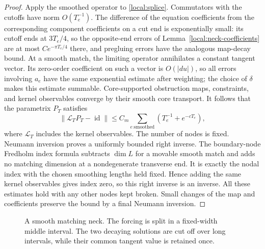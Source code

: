 \documentclass[11pt]{article}
\theoremstyle{definition}
\theoremstyle{remark}
\DeclareMathOperator{\id}{id}
\numberwithin{equation}{section}
\begin{document}
\begin{proof}
Apply the smoothed operator to \eqref{local:splice}.  Commutators with
the cutoffs have norm $O(T_e^{-1})$.  The difference of the equation
coefficients from the corresponding component coefficients on a
cut end is exponentially small: its cutoff ends at $3T_e/4$, so the
opposite-end errors of Lemma~\ref{local:neck-coefficients} are at most
$Ce^{-\pi T_e/4}$ there, and pregluing errors have the analogous
map-decay bound.  At a smooth match, the limiting operator annihilates
a constant tangent vector.  Its zero-order coefficient on such a
vector is $O(|du|)$, so all errors involving $a_e$ have the same
exponential estimate after weighting; the choice of $\delta$ makes
this estimate summable.  Core-supported obstruction maps, constraints,
and kernel observables converge by their smooth core transport.
It follows that the parametrix $P_T$ satisfies
\begin{equation}\label{local:parametrix-error}
 \|\mathcal L_TP_T-\id\|
   \leq C_m\sum_{e\ \mathrm{smoothed}}
                      (T_e^{-1}+e^{-cT_e}),
\end{equation}
where $\mathcal L_T$ includes the kernel observables.  The number of
nodes is fixed.  Neumann inversion proves a uniformly bounded right
inverse.  The boundary-node Fredholm index formula subtracts
$\dim L$ for a movable smooth match and adds no matching dimension
at a nondegenerate transverse end.  It is exactly the nodal index
with the chosen smoothing lengths held fixed.  Hence adding the
same kernel observables gives index zero, so this right inverse is
an inverse.  All these estimates hold with any other nodes kept
broken.  Small changes of the map and coefficients preserve the
bound by a final Neumann inversion.
\end{proof}

\begin{figure}[ht]
\centering
{}
\caption{A smooth matching neck.  The forcing is split in a fixed-width
middle interval.  The two decaying solutions are cut off over long
intervals, while their common tangent value is retained once.}
\label{local:neck-figure}
\end{figure}
\end{document}
